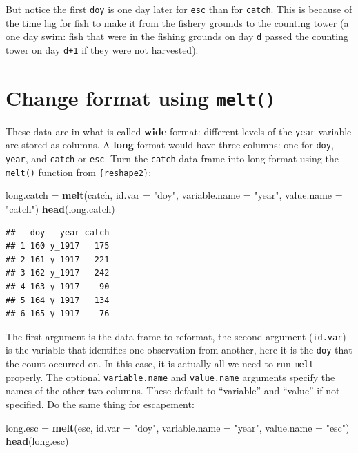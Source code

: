 \documentclass[]{book}
\newenvironment{Shaded}{\begin{snugshade}}{\end{snugshade}}
\newcommand{\DataTypeTok}[1]{\textcolor[rgb]{0.13,0.29,0.53}{#1}}
\newcommand{\KeywordTok}[1]{\textcolor[rgb]{0.13,0.29,0.53}{\textbf{#1}}}
\newcommand{\NormalTok}[1]{#1}
\newcommand{\StringTok}[1]{\textcolor[rgb]{0.31,0.60,0.02}{#1}}
\begin{document}
But notice the first \texttt{doy} is one day later for \texttt{esc} than for \texttt{catch}. This is because of the time lag for fish to make it from the fishery grounds to the counting tower (a one day swim: fish that were in the fishing grounds on day \texttt{d} passed the counting tower on day \texttt{d+1} if they were not harvested).

\hypertarget{change-format-using-melt}{%
\section{\texorpdfstring{Change format using \texttt{melt()}}{Change format using melt()}}\label{change-format-using-melt}}

These data are in what is called \textbf{wide} format: different levels of the \texttt{year} variable are stored as columns. A \textbf{long} format would have three columns: one for \texttt{doy}, \texttt{year}, and \texttt{catch} or \texttt{esc}. Turn the \texttt{catch} data frame into long format using the \texttt{melt()} function from \texttt{\{reshape2\}}:

\begin{Shaded}
\begin{Highlighting}[]
\NormalTok{long.catch =}\StringTok{ }\KeywordTok{melt}\NormalTok{(catch, }\DataTypeTok{id.var =} \StringTok{"doy"}\NormalTok{,}
                  \DataTypeTok{variable.name =} \StringTok{"year"}\NormalTok{,}
                  \DataTypeTok{value.name =} \StringTok{"catch"}\NormalTok{)}
\KeywordTok{head}\NormalTok{(long.catch)}
\end{Highlighting}
\end{Shaded}

\begin{verbatim}
##   doy   year catch
## 1 160 y_1917   175
## 2 161 y_1917   221
## 3 162 y_1917   242
## 4 163 y_1917    90
## 5 164 y_1917   134
## 6 165 y_1917    76
\end{verbatim}

The first argument is the data frame to reformat, the second argument (\texttt{id.var}) is the variable that identifies one observation from another, here it is the \texttt{doy} that the count occurred on. In this case, it is actually all we need to run \texttt{melt} properly. The optional \texttt{variable.name} and \texttt{value.name} arguments specify the names of the other two columns. These default to ``variable'' and ``value'' if not specified. Do the same thing for escapement:

\begin{Shaded}
\begin{Highlighting}[]
\NormalTok{long.esc =}\StringTok{ }\KeywordTok{melt}\NormalTok{(esc, }\DataTypeTok{id.var =} \StringTok{"doy"}\NormalTok{,}
                \DataTypeTok{variable.name =} \StringTok{"year"}\NormalTok{,}
                \DataTypeTok{value.name =} \StringTok{"esc"}\NormalTok{)}
\KeywordTok{head}\NormalTok{(long.esc)}
\end{Highlighting}
\end{Shaded}
\end{document}
